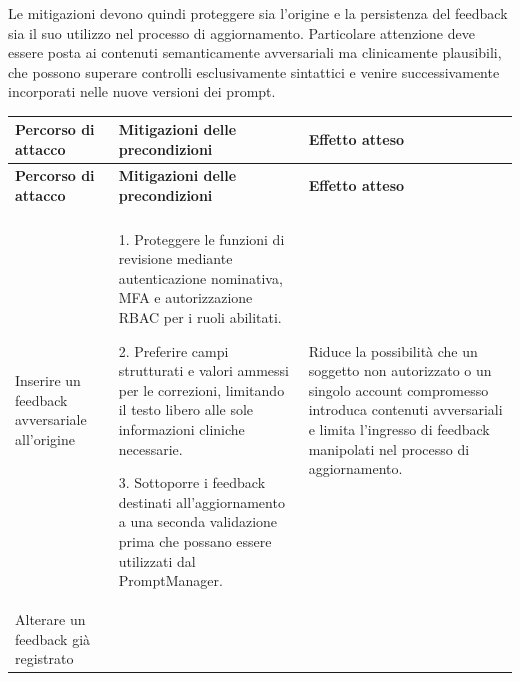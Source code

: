 Le mitigazioni devono quindi proteggere sia l'origine e la persistenza del feedback sia il suo utilizzo nel processo di aggiornamento. Particolare attenzione deve essere posta ai contenuti semanticamente avversariali ma clinicamente plausibili, che possono superare controlli esclusivamente sintattici e venire successivamente incorporati nelle nuove versioni dei prompt.

{
\small
{}
\setlength{\tabcolsep}{4pt}
\renewcommand{\arraystretch}{1.07}

\begin{xltabular}{\textwidth}{
    >{\raggedright\arraybackslash}p{3.1cm}
    X
    X
}

\toprule

\textbf{Percorso di attacco} &
\textbf{Mitigazioni delle precondizioni} &
\textbf{Effetto atteso} \\

\midrule

\endfirsthead

\toprule

\textbf{Percorso di attacco} &
\textbf{Mitigazioni delle precondizioni} &
\textbf{Effetto atteso} \\

\midrule

\endhead

 \\
\endfoot

\endlastfoot


Inserire un feedback avversariale all'origine &

1. Proteggere le funzioni di revisione mediante autenticazione nominativa,
MFA e autorizzazione RBAC per i ruoli abilitati.

2. Preferire campi strutturati e valori ammessi per le correzioni, limitando
il testo libero alle sole informazioni cliniche necessarie.

3. Sottoporre i feedback destinati all'aggiornamento a una seconda
validazione prima che possano essere utilizzati dal PromptManager. &

Riduce la possibilità che un soggetto non autorizzato o un singolo account
compromesso introduca contenuti avversariali e limita l'ingresso di feedback
manipolati nel processo di aggiornamento. \\

\midrule


Alterare un feedback già registrato &


\end{xltabular}}
